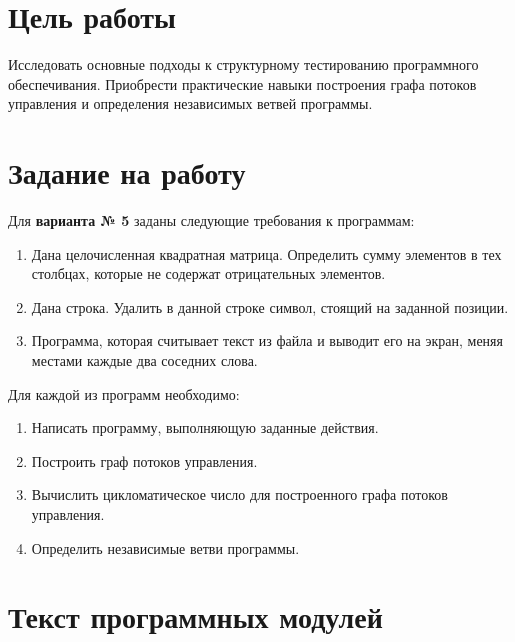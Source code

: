 \documentclass[a4paper,14pt]{extarticle}
\begin{document}

    \section{Цель работы}

    Исследовать основные подходы к структурному тестированию программного
    обеспечивания. Приобрести практические навыки построения графа потоков
    управления и определения независимых ветвей программы.

    \section{Задание на работу}

    Для \textbf{варианта № 5} заданы следующие требования к программам: 
    \begin{enumerate}
        \item Дана целочисленная квадратная матрица. Определить сумму элементов
              в тех столбцах, которые не содержат отрицательных элементов.
        \item Дана строка. Удалить в данной строке символ, стоящий на заданной
              позиции.
        \item Программа, которая считывает текст из файла и выводит его на
              экран, меняя местами каждые два соседних слова.
    \end{enumerate}
    Для каждой из программ необходимо:
    \begin{enumerate}
        \item Написать программу, выполняющую заданные действия.
        \item Построить граф потоков управления.
        \item Вычислить цикломатическое число для построенного графа потоков управления.
        \item Определить независимые ветви программы.
    \end{enumerate}

    \section{Текст программных модулей}
\end{document}
